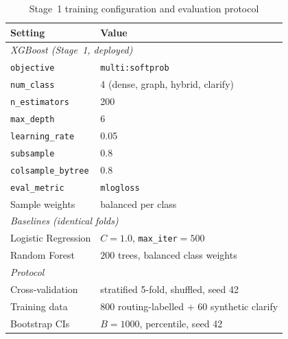 \begin{table}[!htbp]
\centering
\caption{Stage~1 training configuration and evaluation
protocol}\label{tab:hyperparams}
\footnotesize
\begin{tabular}{ll}
\toprule
\textbf{Setting} & \textbf{Value} \\
\midrule
\multicolumn{2}{l}{\emph{XGBoost (Stage~1, deployed)}}\\
\texttt{objective} & \texttt{multi:softprob} \\
\texttt{num\_class} & 4 (dense, graph, hybrid, clarify) \\
\texttt{n\_estimators} & 200 \\
\texttt{max\_depth} & 6 \\
\texttt{learning\_rate} & 0.05 \\
\texttt{subsample} & 0.8 \\
\texttt{colsample\_bytree} & 0.8 \\
\texttt{eval\_metric} & \texttt{mlogloss} \\
Sample weights & balanced per class \\
\midrule
\multicolumn{2}{l}{\emph{Baselines (identical folds)}}\\
Logistic Regression & $C=1.0$, \texttt{max\_iter}$=500$ \\
Random Forest & $200$ trees, balanced class weights \\
\midrule
\multicolumn{2}{l}{\emph{Protocol}}\\
Cross-validation & stratified 5-fold, shuffled, seed 42 \\
Training data & $800$ routing-labelled + $60$ synthetic clarify \\
Bootstrap CIs & $B=1000$, percentile, seed 42 \\
\bottomrule
\end{tabular}
\end{table}
